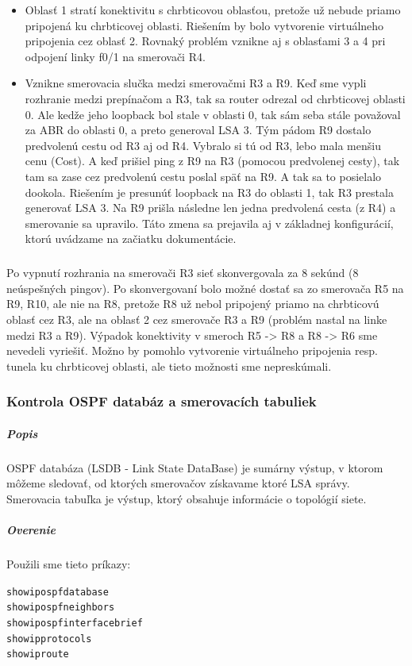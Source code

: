 \documentclass[12pt,twoside,a4paper]{article}
\begin{document}
\begin{itemize}
\item Oblasť 1 stratí konektivitu s chrbticovou oblasťou, pretože už nebude priamo pripojená ku chrbticovej oblasti. Riešením by bolo vytvorenie virtuálneho pripojenia cez oblasť 2. Rovnaký problém vznikne aj s oblasťami 3 a 4 pri odpojení linky f0/1 na smerovači R4.
\item Vznikne smerovacia slučka medzi smerovačmi R3 a R9. Keď sme vypli rozhranie  medzi prepínačom a R3, tak sa router odrezal od chrbticovej oblasti 0. Ale kedže jeho loopback bol stale v oblasti 0, tak sám seba stále považoval za ABR do oblasti 0, a preto generoval LSA 3. Tým pádom R9 dostalo predvolenú cestu od R3 aj od R4. Vybralo si tú od R3, lebo mala menšiu cenu (Cost). A keď prišiel ping z R9 na R3 (pomocou predvolenej cesty), tak tam sa zase cez predvolenú cestu poslal späť na R9. A tak sa to posielalo dookola. Riešením je presunúť loopback na R3 do oblasti 1, tak R3 prestala generovať LSA 3. Na R9 prišla následne len jedna predvolená cesta (z R4) a smerovanie sa upravilo. Táto zmena sa prejavila aj v základnej konfigurácií, ktorú uvádzame na začiatku dokumentácie.
\end{itemize}

\subparagraph{}
Po vypnutí rozhrania  na smerovači R3 sieť skonvergovala za 8 sekúnd (8 neúspešných pingov). Po skonvergovaní bolo možné dostať sa zo smerovača R5 na R9, R10, ale nie na R8, pretože R8 už nebol pripojený priamo na chrbticovú oblasť cez R3, ale na oblasť 2 cez smerovače R3 a R9 (problém nastal na linke medzi R3 a R9). Výpadok konektivity v smeroch R5 -\textgreater{} R8 a R8 -\textgreater{} R6 sme nevedeli vyriešiť. Možno by pomohlo vytvorenie virtuálneho pripojenia resp. tunela ku chrbticovej oblasti, ale tieto možnosti sme nepreskúmali.




\subsubsection*{Kontrola OSPF databáz a smerovacích tabuliek}
\subparagraph{Popis}
\subparagraph{}
OSPF databáza (LSDB - Link State DataBase) je sumárny výstup, v ktorom môžeme sledovať, od ktorých smerovačov získavame ktoré LSA správy. Smerovacia tabuľka je výstup, ktorý obsahuje informácie o topológií siete.

\subparagraph{Overenie}
\subparagraph{}
Použili sme tieto príkazy:

\noindent
{\selectfont
\begin{small}
\begin{alltt}

show ip ospf database
show ip ospf neighbors
show ip ospf interface brief
show ip protocols
show ip route

\end{alltt}
\end{small}
}
\end{document}
